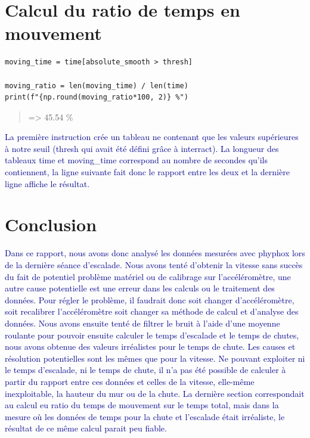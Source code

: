 \documentclass[11pt]{article}
\begin{document}
\section{Calcul du ratio de temps en mouvement}
\label{sec:org1c7c718}

\begin{verbatim}
moving_time = time[absolute_smooth > thresh]

moving_ratio = len(moving_time) / len(time) 
print(f"{np.round(moving_ratio*100, 2)} %")
\end{verbatim}

\begin{quote}
=> 45.54 \%
\end{quote}

\textcolor{darkblue}{La première instruction crée un tableau ne contenant que les valeurs supérieures à notre seuil (thresh qui avait été défini grâce à interract). La longueur des tableaux time et moving\_time correspond au nombre de secondes qu'ils contiennent, la ligne suivante fait donc le rapport entre les deux et la dernière ligne affiche le résultat.}
\section{Conclusion}
\label{sec:org47b23fb}

\textcolor{darkblue}{Dans ce rapport, nous avons donc analysé les données mesurées avec phyphox lors de la dernière séance d'escalade. Nous avons tenté d'obtenir la vitesse sans succès du fait de potentiel problème matériel ou de calibrage sur l'accéléromètre, une autre cause potentielle est une erreur dans les calculs ou le traitement des données. Pour régler le problème, il faudrait donc soit changer d'accéléromètre, soit recalibrer l'accéléromètre soit changer sa méthode de calcul et d'analyse des données. Nous avons ensuite tenté de filtrer le bruit à l'aide d'une moyenne roulante pour pouvoir ensuite calculer le temps d'escalade et le temps de chutes, nous avons obtenue des valeurs irréalistes pour le temps de chute. Les causes et résolution potentielles sont les mêmes que pour la vitesse. Ne pouvant exploiter ni le temps d'escalade, ni le temps de chute, il n'a pas été possible de calculer à partir du rapport entre ces données et celles de la vitesse, elle-même inexploitable, la hauteur du mur ou de la chute. La dernière section correspondait au calcul eu ratio du temps de mouvement sur le temps total, mais dans la mesure où les données de temps pour la chute et l'escalade était irréaliste, le résultat de ce même calcul parait peu fiable.}
\end{document}
